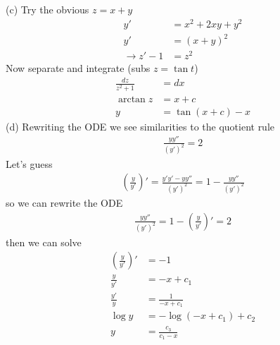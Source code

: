 \documentclass[10pt,a4paper]{book}
\theoremstyle{definition}
\begin{document}
(c) Try the obvious $z=x+y$
\begin{align}
y'&=x^2+2xy+y^2\\
y'&=(x+y)^2\\
\rightarrow z'-1&=z^2
\end{align}
Now separate and integrate (subs $z=\tan t$)
\begin{align}
\frac{dz}{z^2+1}&=dx\\
\arctan z&=x+c\\
y&=\tan(x+c)-x
\end{align}
(d) Rewriting the ODE we see similarities to the quotient rule
\begin{align}
\frac{yy''}{(y')^2}=2
\end{align}
Let's guess
\begin{align}
\left(\frac{y}{y'}\right)'=\frac{y'y'-yy''}{(y')^2}=1-\frac{yy''}{(y')^2}
\end{align}
so we can rewrite the ODE
\begin{align}
\frac{yy''}{(y')^2}=1-\left(\frac{y}{y'}\right)'=2
\end{align}
then we can solve
\begin{align}
\left(\frac{y}{y'}\right)'&=-1\\
\frac{y}{y'}&=-x+c_1\\
\frac{y'}{y}&=\frac{1}{-x+c_1}\\
\log y&=-\log(-x+c_1)+c_2\\
y&=\frac{c_3}{c_1-x}
\end{align}
\end{document}
